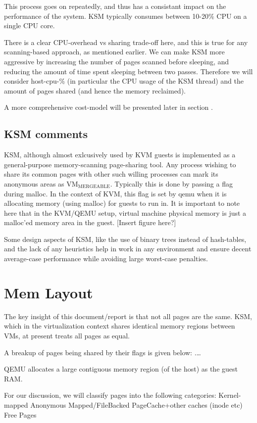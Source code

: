 \documentclass[11pt]{article}
\begin{document}
This process goes on repeatedly, and thus has a consistant impact on the performance of the system. KSM typically consumes between 10-20\% CPU on a single CPU core. 

There is a clear CPU-overhead vs sharing trade-off here, and this is true for any scanning-based approach, as mentioned earlier. We can make KSM more aggressive by increasing the number of pages scanned before sleeping, and reducing the amount of time spent sleeping between two passes. 
Therefore we will consider host-cpu-\% (in particular the CPU usage of the KSM thread) and the amount of pages shared (and hence the memory reclaimed).

A more comprehensive cost-model will be presented later in section . 
\subsection{KSM comments}
\label{sec-6_1}

KSM, although almost exlcusively used by KVM guests is implemented as a general-purpose memory-scanning page-sharing tool. Any process wishing to share its common pages with other such willing processes can mark its anonymous areas as VM$_{\mathrm{MERGEABLE}}$. Typically this is done by passing a flag during malloc. 
In the context of KVM, this flag is set by qemu when it is allocating memory (using malloc) for guests to run in. It is important to note here that in the KVM/QEMU setup, virtual machine physical memory is just a malloc'ed memory area in the guest. 
[Insert figure here?]

Some design aspects of KSM, like the use of binary trees instead of hash-tables, and the lack of any heuristics help in work in any environment and ensure decent average-case performance while avoiding large worst-case penalties. 
\section{Mem Layout}
\label{sec-7}

The key insight of this document/report is that not all pages are the
same. KSM, which in the virtualization context shares identical memory
regions between VMs, at present treats all pages as equal. 

A breakup of pages being shared by their flags is given below:
.\ldots{}

QEMU allocates a large contiguous memory region (of the host) as the
guest RAM.

For our discussion, we will classify pages into the following
categories:
Kernel-mapped
Anonymous
Mapped/FileBacked
PageCache+other caches (inode etc)
Free Pages
\end{document}
